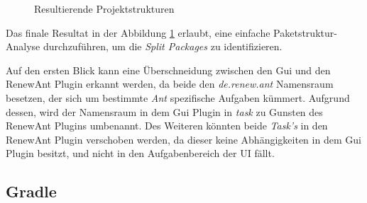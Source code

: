 	\begin{figure}[h!]
		\centering
		\footnotesize
		\setlength{\DTbaselineskip}{10pt}
		\begin{minipage}{.45\textwidth}
		\end{minipage}
		\begin{minipage}{.5\textwidth}
		\end{minipage}
	  \caption{Resultierende Projektstrukturen}
	  \label{fig:resultStr}
	\end{figure}

	Das finale Resultat in der Abbildung \ref{fig:resultStr} erlaubt, eine einfache Paketstruktur-Analyse durchzuführen, um die \textit{Split Packages} zu identifizieren. \bigbreak

	Auf den ersten Blick kann eine Überschneidung zwischen den Gui und den RenewAnt Plugin erkannt werden, da beide den \textit{de.renew.ant} Namensraum besetzen, der sich um bestimmte \textit{Ant} spezifische Aufgaben kümmert. Aufgrund dessen, wird der Namensraum in dem Gui Plugin in \textit{task} zu Gunsten des RenewAnt Plugins umbenannt. Des Weiteren könnten beide \textit{Task's} in den RenewAnt Plugin verschoben werden, da dieser keine Abhängigkeiten in dem Gui Plugin besitzt, und nicht in den Aufgabenbereich der UI fällt. 

\subsection{Gradle}

